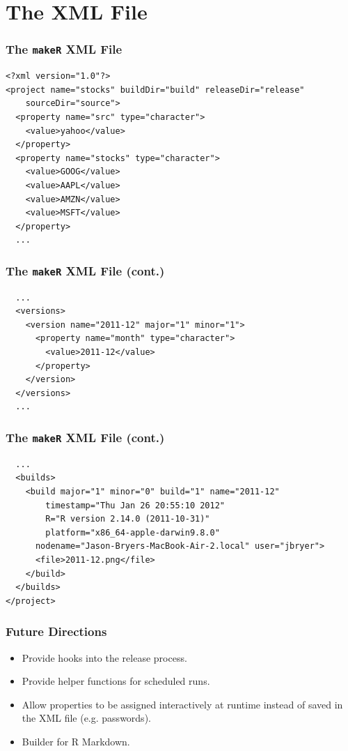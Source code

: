 \documentclass[10pt,slidestop,mathserif,c]{beamer}
\begin{document}
\section{The XML File}
\begin{frame}
	\frametitle{The \texttt{makeR} XML File}
\begin{verbatim}
<?xml version="1.0"?>
<project name="stocks" buildDir="build" releaseDir="release" 
    sourceDir="source">
  <property name="src" type="character">
    <value>yahoo</value>
  </property>
  <property name="stocks" type="character">
    <value>GOOG</value>
    <value>AAPL</value>
    <value>AMZN</value>
    <value>MSFT</value>
  </property>
  ...
\end{verbatim}
\end{frame}

\begin{frame}
	\frametitle{The \texttt{makeR} XML File (cont.)}
\begin{verbatim}
  ...
  <versions>
    <version name="2011-12" major="1" minor="1">
      <property name="month" type="character">
        <value>2011-12</value>
      </property>
    </version>
  </versions>
  ...
\end{verbatim}
\end{frame}

\begin{frame}
	\frametitle{The \texttt{makeR} XML File (cont.)}
\begin{verbatim}
  ...
  <builds>
    <build major="1" minor="0" build="1" name="2011-12" 
        timestamp="Thu Jan 26 20:55:10 2012"
        R="R version 2.14.0 (2011-10-31)" 
        platform="x86_64-apple-darwin9.8.0"
      nodename="Jason-Bryers-MacBook-Air-2.local" user="jbryer">
      <file>2011-12.png</file>
    </build>
  </builds>
</project>
\end{verbatim}
\end{frame}

\begin{frame}
	\frametitle{Future Directions}
	\begin{itemize}
	\item Provide hooks into the release process. 
	\item Provide helper functions for scheduled runs.
	\item Allow properties to be assigned interactively at runtime instead of saved in the XML file (e.g. passwords).
	\item Builder for R Markdown.
	\end{itemize}
\end{frame}
\end{document}

